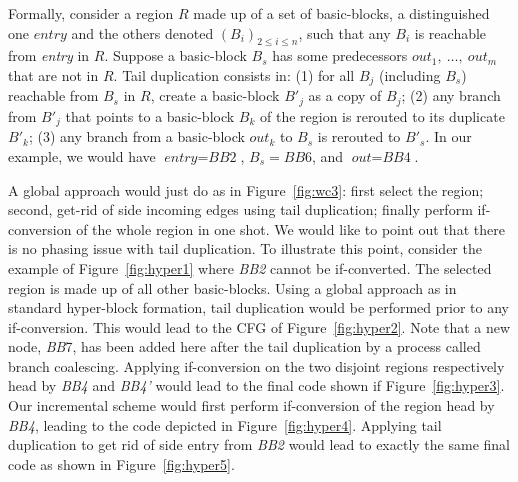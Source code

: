 Formally, consider a region $R$ made up of a set of basic-blocks, a distinguished one $\textit{entry}$ and the others denoted $\left(B_i\right)_{2\leq i\leq n}$, such that any $B_i$ is reachable from \textit{entry} in $R$. Suppose a basic-block $B_s$ has some predecessors $\textit{out}_1,\ \dots,\ \textit{out}_m$ that are not in $R$. Tail duplication consists in: (1) for all $B_j$ (including $B_s$) reachable from $B_s$ in $R$, create a basic-block $B'_j$ as a copy of $B_j$; (2) any branch from $B'_j$ that points to a basic-block $B_k$ of the region is rerouted to its duplicate $B'_k$; (3) any branch from a basic-block $\textit{out}_k$ to $B_s$ is rerouted to $B'_s$. In our example, we would have $\textit{entry}=\textit{BB2}$, $B_s=\textit{BB6}$, and $\textit{out}=\textit{BB4}$.

A global approach would just do as in Figure~\ref{fig:wc3}: first select the region; second, get-rid of side incoming edges using tail duplication; finally perform if-conversion of the whole region in one shot. We would like to point out that there is no phasing issue with tail duplication. To illustrate this point, consider the example of Figure~\ref{fig:hyper1} where \textit{BB2} cannot be if-converted. The selected region is made up of all other basic-blocks. Using a global approach as in standard hyper-block formation, tail duplication would be performed prior to any if-conversion. This would lead to the CFG of Figure~\ref{fig:hyper2}. Note that a new node, \textit{BB}7, has been added here after the tail duplication by a process called branch coalescing. Applying if-conversion on the two disjoint regions respectively head by \textit{BB4} and \textit{BB4'} would lead to the final code shown if Figure~\ref{fig:hyper3}. Our incremental scheme would first perform if-conversion of the region head by \textit{BB4}, leading to the code depicted in Figure~\ref{fig:hyper4}. Applying tail duplication to get rid of side entry from \textit{BB2} would lead to exactly the same final code as shown in Figure~\ref{fig:hyper5}.

